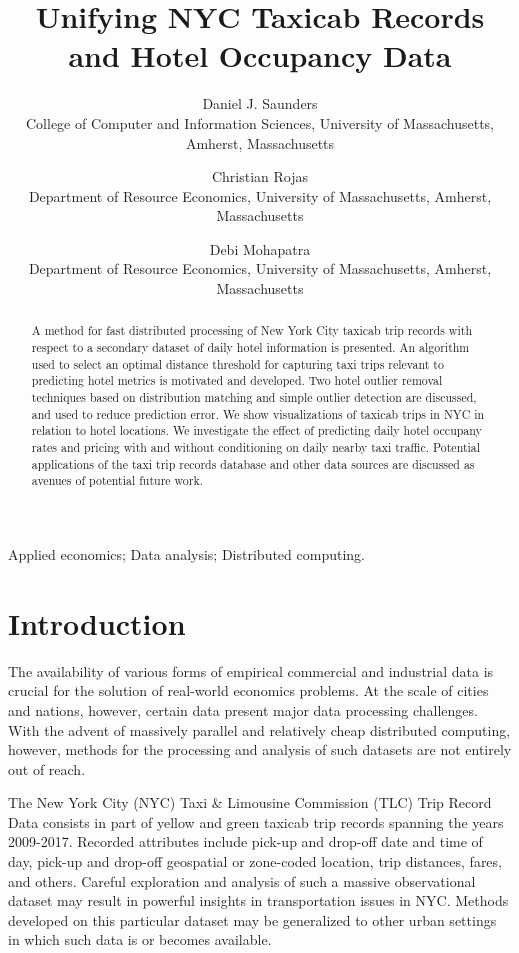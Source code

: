 \documentclass[useAMS, referee, usenatbib]{biom}
\title{Unifying NYC Taxicab Records and Hotel Occupancy Data}
\author
{Daniel J. Saunders \emailx{djsaunde@cs.umass.edu} \\
College of Computer and Information Sciences, University of Massachusetts, Amherst, Massachusetts
\and
Christian Rojas \emailx{rojas@resecon.umass.edu} \\
Department of Resource Economics, University of Massachusetts, 
Amherst, Massachusetts
\and
Debi Mohapatra \emailx{dmohapatra@umass.edu} \\
Department of Resource Economics, University of Massachusetts, 
Amherst, Massachusetts}
\begin{document}
\label{firstpage}

\begin{abstract}
A method for fast distributed processing of New York City taxicab trip records with respect to a secondary dataset of daily hotel information is presented. An algorithm used to select an optimal distance threshold for capturing taxi trips relevant to predicting hotel metrics is motivated and developed. Two hotel outlier removal techniques based on distribution matching and simple outlier detection are discussed, and used to reduce prediction error. We show visualizations of taxicab trips in NYC in relation to hotel locations. We investigate the effect of predicting daily hotel occupany rates and pricing with and without conditioning on daily nearby taxi traffic. Potential applications of the taxi trip records database and other data sources are discussed as avenues of potential future work.
\end{abstract}

\begin{keywords}
Applied economics; Data analysis; Distributed computing.
\end{keywords}

\maketitle

\section{Introduction}
\label{s:intro}

The availability of various forms of empirical commercial and industrial data is crucial for the solution of real-world economics problems. At the scale of cities and nations, however, certain data present major data processing challenges. With the advent of massively parallel and relatively cheap distributed computing, however, methods for the processing and analysis of such datasets are not entirely out of reach.

The New York City (NYC) Taxi \& Limousine Commission (TLC) Trip Record Data consists in part of yellow and green taxicab trip records spanning the years 2009-2017. Recorded attributes include pick-up and drop-off date and time of day, pick-up and drop-off geospatial or zone-coded location, trip distances, fares, and others. Careful exploration and analysis of such a massive observational dataset may result in powerful insights in transportation issues in NYC. Methods developed on this particular dataset may be generalized to other urban settings in which such data is or becomes available.
\end{document}
